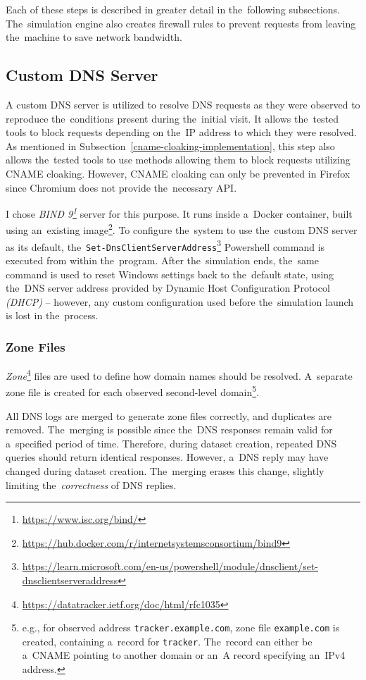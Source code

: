 Each of these steps is described in greater detail in the~following subsections. The~simulation engine also creates firewall rules to prevent requests from leaving the~machine to save network bandwidth. 


\subsection{Custom DNS Server}
A custom DNS server is utilized to resolve DNS requests as they were observed to reproduce the~conditions present during the~initial visit. It allows the~tested tools to block requests depending on the~IP address to which they were resolved.
As mentioned in Subsection~\ref{cname-cloaking-implementation}, this step also allows the~tested tools to use methods allowing them to block requests utilizing CNAME cloaking. However, CNAME cloaking can only be prevented in Firefox since Chromium does not provide the~necessary API. 

I chose \textit{BIND 9\footnote{\url{https://www.isc.org/bind/}}} server for this purpose. It runs inside a~Docker container, built using an~existing image\footnote{\url{https://hub.docker.com/r/internetsystemsconsortium/bind9}}. To configure the~system to use the~custom DNS server as its default, the~\texttt{Set-DnsClientServerAddress}\footnote{\url{https://learn.microsoft.com/en-us/powershell/module/dnsclient/set-dnsclientserveraddress}} Powershell command is executed from within the~program. After the~simulation ends, the~same command is used to reset Windows settings back to the~default state, using the~DNS server address provided by Dynamic Host Configuration Protocol \textit{(DHCP)} -- however, any custom configuration used before the~simulation launch is lost in the~process.

\subsubsection{Zone Files}
\textit{Zone}\footnote{\url{https://datatracker.ietf.org/doc/html/rfc1035}} files are used to define how domain names should be resolved. A~separate zone file is created for each observed second-level domain\footnote{e.g., for observed address \texttt{tracker.example.com}, zone file \texttt{example.com} is created, containing a~record for \texttt{tracker}. The~record can either be a~CNAME pointing to another domain or an~A record specifying an~IPv4 address.}. 

All DNS logs are merged to generate zone files correctly, and duplicates are removed. The~merging is possible since the~DNS responses remain valid for a~specified period of time. Therefore, during dataset creation, repeated DNS queries should return identical responses. However, a~DNS reply may have changed during dataset creation. The~merging erases this change, slightly limiting the~\textit{correctness} of DNS replies. 

